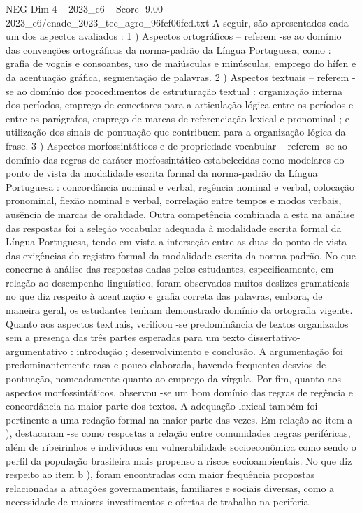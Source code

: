 \begin{textsample}{NEG Dim 4 – 2023\_c6 – Score -9.00 – 2023\_c6/enade\_2023\_tec\_agro\_96fcf06fcd.txt}
A seguir, são apresentados cada um dos aspectos avaliados : 1 ) Aspectos ortográficos – referem -se ao domínio das convenções ortográficas da norma-padrão da Língua Portuguesa, como : grafia de vogais e consoantes, uso de maiúsculas e minúsculas, emprego do hífen e da acentuação gráfica, segmentação de palavras. 2 ) Aspectos textuais – referem -se ao domínio dos procedimentos de estruturação textual : organização interna dos períodos, emprego de conectores para a articulação lógica entre os períodos e entre os parágrafos, emprego de marcas de referenciação lexical e pronominal ; e utilização dos sinais de pontuação que contribuem para a organização lógica da frase. 3 ) Aspectos morfossintáticos e de propriedade vocabular – referem -se ao domínio das regras de caráter morfossintático estabelecidas como modelares do ponto de vista da modalidade escrita formal da norma-padrão da Língua Portuguesa : concordância nominal e verbal, regência nominal e verbal, colocação pronominal, flexão nominal e verbal, correlação entre tempos e modos verbais, ausência de marcas de oralidade.
Outra competência combinada a esta na análise das respostas foi a seleção vocabular adequada à modalidade escrita formal da Língua Portuguesa, tendo em vista a interseção entre as duas do ponto de vista das exigências do registro formal da modalidade escrita da norma-padrão.
No que concerne à análise das respostas dadas pelos estudantes, especificamente, em relação ao desempenho linguístico, foram observados muitos deslizes gramaticais no que diz respeito à acentuação e grafia correta das palavras, embora, de maneira geral, os estudantes tenham demonstrado domínio da ortografia vigente.
Quanto aos aspectos textuais, verificou -se predominância de textos organizados sem a presença das três partes esperadas para um texto dissertativo-argumentativo : introdução ; desenvolvimento e conclusão.
A argumentação foi predominantemente rasa e pouco elaborada, havendo frequentes desvios de pontuação, nomeadamente quanto ao emprego da vírgula.
Por fim, quanto aos aspectos morfossintáticos, observou -se um bom domínio das regras de regência e concordância na maior parte dos textos.
A adequação lexical também foi pertinente a uma redação formal na maior parte das vezes.
Em relação ao item a ), destacaram -se como respostas a relação entre comunidades negras periféricas, além de ribeirinhos e indivíduos em vulnerabilidade socioeconômica como sendo o perfil da população brasileira mais propenso a riscos socioambientais.
No que diz respeito ao item b ), foram encontradas com maior frequência propostas relacionadas a atuações governamentais, familiares e sociais diversas, como a necessidade de maiores investimentos e ofertas de trabalho na periferia.

\end{textsample}
